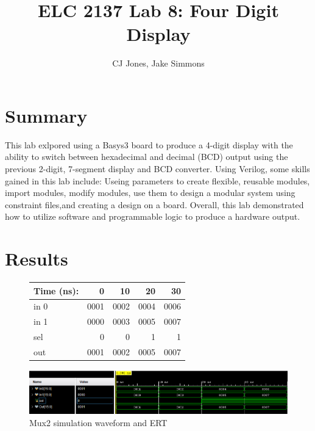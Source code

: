 \documentclass[11pt]{article}
\begin{document}
\title{ELC 2137 Lab 8: Four Digit Display}
\author{CJ Jones, Jake Simmons}

\maketitle


\section*{Summary}

This lab exlpored using a Basys3 board to produce a 4-digit display with the ability to switch between hexadecimal and decimal (BCD) output using the previous 2-digit, 7-segment display and BCD converter. Using Verilog, some skills gained in this lab include:  Useing parameters to create ﬂexible, reusable modules, import modules, modify modules, use them to design a modular system using constraint files,and creating a design on a board. Overall, this lab demonstrated how to utilize software and programmable logic to produce a hardware output.













\section*{Results}




\begin{figure}[ht]\centering
	\begin{tabular}{l|rrrr}
		Time (ns): & 0 & 10 & 20 & 30 \\
		\midrule 
		in 0 & 0001 & 0002 & 0004 & 0006 \\
		in 1 & 0000 & 0003 & 0005 & 0007 \\
		sel & 0 & 0 & 1 & 1 \\
		\bottomrule
		out & 0001 & 0002 &0005 &0007
	\end{tabular}\medskip
	
	\includegraphics[width=1.0\textwidth]{Mux2_Test}
	\caption{Mux2 simulation waveform and ERT}
	\label{fig:sim_with_table}
\end{figure}
\end{document}

